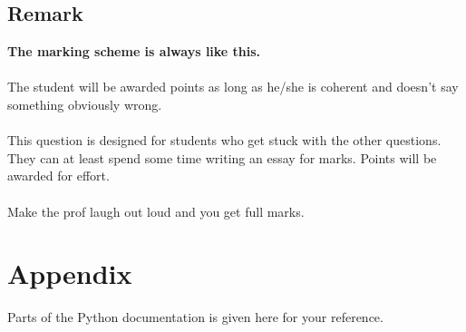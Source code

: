 \subsection{Remark}
\textbf{The marking scheme is always like this.} \\ \\
The student will be awarded points as long as he/she is coherent and doesn’t say something
obviously wrong. \\ \\
This question is designed for students who get stuck with the other questions. They can at
least spend some time writing an essay for marks. Points will be awarded for effort. \\ \\
Make the prof laugh out loud and you get full marks.

\newpage
\section{Appendix}
Parts of the Python documentation is given here for your reference.
